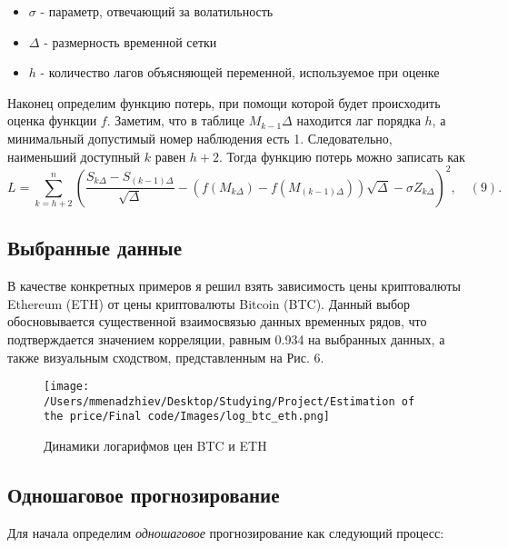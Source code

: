 \begin{itemize}

\item $\sigma$ - параметр, отвечающий за волатильность

\item $\Delta$ - размерность временной сетки

\item $h$ - количество лагов объясняющей переменной, используемое при оценке

\end{itemize}

\vspace{-10pt}

Наконец определим функцию потерь, при помощи которой будет происходить оценка функции $f$. Заметим, что в таблице $M_{k - 1} \Delta$ находится лаг порядка $h$, а минимальный допустимый номер наблюдения есть 1. Следовательно, наименьший доступный $k$ равен $h + 2$. Тогда функцию потерь можно записать как
\[
L = \sum\limits_{k = h + 2}^n \left( \frac{S_{k \Delta} - S_{(k - 1) \Delta}}{\sqrt{\Delta}} - \left( f(M_{k \Delta}) - f(M_{(k - 1) \Delta}) \right) \sqrt{\Delta} - \sigma Z_{k \Delta} \right)^2, \quad (9).
\]

\subsection{Выбранные данные}

В качестве конкретных примеров я решил взять зависимость цены криптовалюты Ethereum (ETH) от цены криптовалюты Bitcoin (BTC). Данный выбор обосновывается существенной взаимосвязью данных временных рядов, что подтверждается значением корреляции, равным 0.934 на выбранных данных, а также визуальным сходством, представленным на Рис. 6.

\begin{figure}[H]
    \centering
    \texttt{[image: /Users/mmenadzhiev/Desktop/Studying/Project/Estimation of the price/Final code/Images/log\_btc\_eth.png]}
    \caption{Динамики логарифмов цен BTC и ETH}
\end{figure}

\subsection{Одношаговое прогнозирование}

Для начала определим \textit{одношаговое} прогнозирование как следующий процесс:

\vspace{-15pt}

